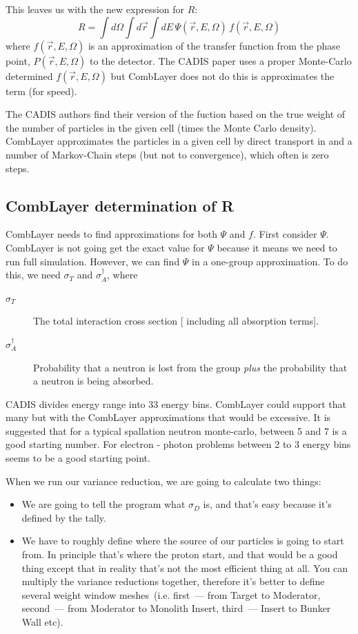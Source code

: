 This leaves us with the new expression for $R$:
\begin{equation}
  \label{eq:vr:R1}
  R = \int d\Omega \int d\vec{r} \int dE \, \Psi(\vec{r},E,\Omega) \, f(\vec{r},E,\Omega)
\end{equation}
where $f(\vec{r},E,\Omega)$ is an approximation of the transfer function
from the phase point, $P(\vec{r},E,\Omega)$ to the detector. The CADIS paper
uses a proper Monte-Carlo determined $f(\vec{r},E,\Omega)$ but CombLayer
does not do this is approximates the term (for speed).

The CADIS authors find their version of the fuction based on the true weight of
the number of particles in the given cell (times the Monte Carlo density).
CombLayer approximates the particles in a given cell by direct transport in
and a number of Markov-Chain steps (but not to convergence), which often
is zero steps.

\subsection{CombLayer determination of R}

CombLayer needs to find approximations for both $\Psi$ and $f$.
First consider $\Psi$. CombLayer is not going get the exact value for
$\Psi$ because it means we need to run full simulation.
However, we can find $\Psi$ in a one-group approximation.
To do this, we need $\sigma_{T}$ and $\sigma_{A}^\dagger$, where

\begin{description}
\item[$\sigma_{T}$] The total interaction cross section [
  including all absorption terms].
\item[$\sigma_{A}^\dagger$] Probability that a neutron is lost from the group {\em plus} the probability that a neutron is being absorbed.
\end{description}

CADIS divides energy range into 33 energy bins.
CombLayer could support that many but with the CombLayer approximations
that would be excessive. It is suggested that for a typical spallation
neutron monte-carlo, between 5 and 7 is a good starting number.
For electron - photon problems between 2 to 3 energy bins seems to be
a good starting point.

\bigskip

When we run our variance reduction, we are going to calculate two things:
\begin{itemize}
\item We are going to tell the program what $\sigma_D$ is, and that's easy because it's defined by the tally.
\item We have to roughly define where the source of our particles is going to start from. In principle that's where the proton start,
  and that would be a good thing except that in reality that's not the most efficient thing at all.
  You can multiply the variance reductions together, therefore it's better to define several weight window meshes~(i.e.
  first~--- from Target to Moderator, second~--- from Moderator to Monolith Insert, third~--- Insert to Bunker Wall etc).
\end{itemize}


